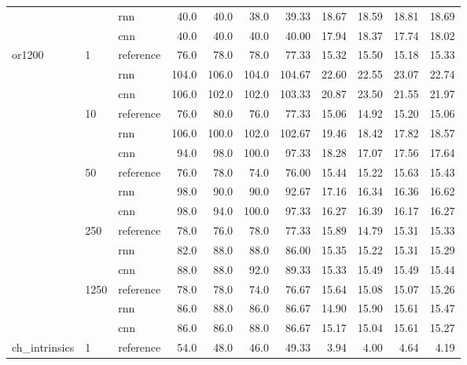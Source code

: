 \begin{table}
{\begin{tabular}{lllrrrrrrrr}
	&      & rnn &          40.0 &   40.0 &   38.0 &   39.33 &         18.67 &  18.59 &  18.81 &  18.69 \\
	&      & cnn &          40.0 &   40.0 &   40.0 &   40.00 &         17.94 &  18.37 &  17.74 &  18.02 \\
	or1200 & 1    & reference &          76.0 &   78.0 &   78.0 &   77.33 &         15.32 &  15.50 &  15.18 &  15.33 \\
	&      & rnn &         104.0 &  106.0 &  104.0 &  104.67 &         22.60 &  22.55 &  23.07 &  22.74 \\
	&      & cnn &         106.0 &  102.0 &  102.0 &  103.33 &         20.87 &  23.50 &  21.55 &  21.97 \\
	& 10   & reference &          76.0 &   80.0 &   76.0 &   77.33 &         15.06 &  14.92 &  15.20 &  15.06 \\
	&      & rnn &         106.0 &  100.0 &  102.0 &  102.67 &         19.46 &  18.42 &  17.82 &  18.57 \\
	&      & cnn &          94.0 &   98.0 &  100.0 &   97.33 &         18.28 &  17.07 &  17.56 &  17.64 \\
	& 50   & reference &          76.0 &   78.0 &   74.0 &   76.00 &         15.44 &  15.22 &  15.63 &  15.43 \\
	&      & rnn &          98.0 &   90.0 &   90.0 &   92.67 &         17.16 &  16.34 &  16.36 &  16.62 \\
	&      & cnn &          98.0 &   94.0 &  100.0 &   97.33 &         16.27 &  16.39 &  16.17 &  16.27 \\
	& 250  & reference &          78.0 &   76.0 &   78.0 &   77.33 &         15.89 &  14.79 &  15.31 &  15.33 \\
	&      & rnn &          82.0 &   88.0 &   88.0 &   86.00 &         15.35 &  15.22 &  15.31 &  15.29 \\
	&      & cnn &          88.0 &   88.0 &   92.0 &   89.33 &         15.33 &  15.49 &  15.49 &  15.44 \\
	& 1250 & reference &          78.0 &   78.0 &   74.0 &   76.67 &         15.64 &  15.08 &  15.07 &  15.26 \\
	&      & rnn &          86.0 &   88.0 &   86.0 &   86.67 &         14.90 &  15.90 &  15.61 &  15.47 \\
	&      & cnn &          86.0 &   86.0 &   88.0 &   86.67 &         15.17 &  15.04 &  15.61 &  15.27 \\
	ch\_intrinsics & 1    & reference &          54.0 &   48.0 &   46.0 &   49.33 &          3.94 &   4.00 &   4.64 &   4.19 \\

\end{tabular}}
\end{table}

